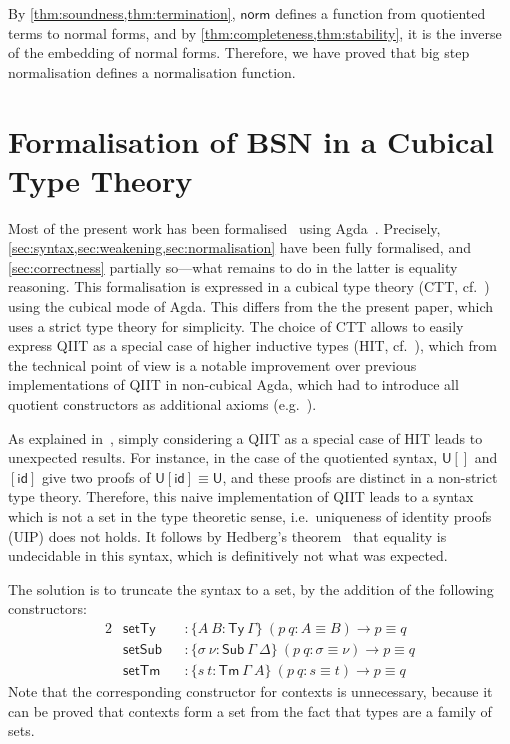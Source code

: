 \documentclass[a4paper,UKenglish,cleveref]{lipics-v2019}
\newcommand{\agdaSymb}[1]{\mathsf{#1}}
\newcommand{\Ty}{\agdaSymb{Ty}}
\newcommand{\Tms}{\agdaSymb{Sub}}
\newcommand{\Tm}{\agdaSymb{Tm}}
\newcommand{\id}{\agdaSymb{id}}
\newcommand{\norm}{\agdaSymb{norm}}
\newcommand{\U}{\agdaSymb{U}}
\newcommand{\isSet}{\agdaSymb{set}}
\begin{document}
By \cref{thm:soundness,thm:termination}, $\norm$ defines a
function from quotiented terms to normal forms, and by
\cref{thm:completeness,thm:stability}, it is the inverse of
the embedding of normal forms. Therefore, we have proved that big step
normalisation defines a normalisation function.

\section{Formalisation of BSN in a Cubical Type Theory}
\label{sec:cubical}
Most of the present work has been formalised~\cite{formalisation} using
Agda~\cite{norell2007agda}. Precisely, \cref{sec:syntax,sec:weakening,sec:normalisation}
have been fully formalised, and \cref{sec:correctness} partially so---what
remains to do in the latter is equality reasoning.
This formalisation is expressed in a cubical type theory (CTT, cf.~\cite{cchm})
using the cubical mode of Agda. This differs from the the present paper, which
uses a strict type theory for simplicity. The choice of CTT allows to easily
express QIIT as a special case of higher inductive types (HIT, cf.~\cite{hott}),
which from the technical point of view is a notable improvement over previous
implementations of QIIT in non-cubical Agda, which had to introduce all quotient
constructors as additional axioms (e.g.~\cite{kaposi2016normalisation,kaposi2016type}).

As explained in~\cite{kaposi2016type}, simply considering a QIIT as a special
case of HIT leads to unexpected results. For instance, in the case of the
quotiented syntax, $\U[]$ and $[\id]$ give two proofs of $\U[\id] \equiv \U$,
and these proofs are distinct in a non-strict type theory. Therefore, this naive
implementation of QIIT leads to a syntax which is not a set in the type theoretic
sense, i.e.\ uniqueness of identity proofs (UIP) does not holds.
It follows by Hedberg's theorem~\cite{hedberg1998coherence} that equality is
undecidable in this syntax, which is definitively not what was expected.

The solution is to truncate the syntax to a set, by the addition of the
following constructors:
\begin{alignat*}{2}
  & \isSet\Ty && : \{A\ B : \Ty\ \Gamma\}\ (p\ q : A \equiv B) \to p \equiv q \\
  & \isSet\Tms && : \{\sigma\ \nu : \Tms\ \Gamma\ \Delta\}\ (p\ q : \sigma \equiv \nu) \to p \equiv q \\
  & \isSet\Tm && : \{s\ t : \Tm\ \Gamma\ A\}\ (p\ q : s \equiv t) \to p \equiv q
\end{alignat*}
Note that the corresponding constructor for contexts is unnecessary, because
it can be proved that contexts form a set from the fact that types are a
family of sets.
\end{document}
